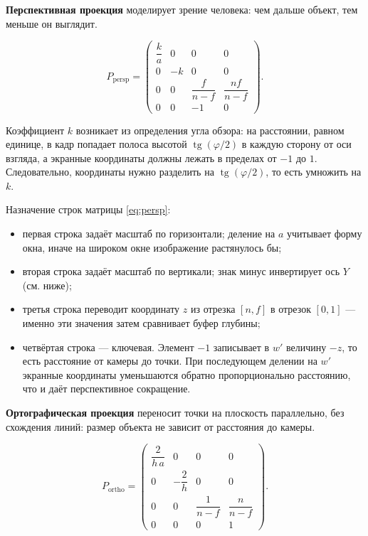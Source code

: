 \documentclass[14pt,a4paper]{extarticle}
\begin{document}
\textbf{Перспективная проекция} моделирует зрение человека: чем дальше объект,
тем меньше он выглядит.

\begin{equation}
	P_{\text{persp}} =
	\begin{pmatrix}
		\dfrac{k}{a} & 0 & 0 & 0 \\[8pt]
		0 & -k & 0 & 0 \\[8pt]
		0 & 0 & \dfrac{f}{n - f} & \dfrac{n f}{n - f} \\[8pt]
		0 & 0 & -1 & 0
	\end{pmatrix}.
	\label{eq:persp}
\end{equation}

Коэффициент $k$ возникает из определения угла обзора: на расстоянии, равном
единице, в кадр попадает полоса высотой $\operatorname{tg}(\varphi/2)$ в каждую
сторону от оси взгляда, а экранные координаты должны лежать в пределах от $-1$
до $1$. Следовательно, координаты нужно разделить на $\operatorname{tg}
(\varphi/2)$, то есть умножить на $k$.

Назначение строк матрицы \eqref{eq:persp}:

\begin{itemize}[leftmargin=*, nosep]
	\item первая строка задаёт масштаб по горизонтали; деление на $a$ учитывает
	форму окна, иначе на широком окне изображение растянулось бы;
	\item вторая строка задаёт масштаб по вертикали; знак минус инвертирует
	ось $Y$ (см. ниже);
	\item третья строка переводит координату $z$ из отрезка $[n, f]$ в отрезок
	$[0, 1]$ — именно эти значения затем сравнивает буфер глубины;
	\item четвёртая строка — ключевая. Элемент $-1$ записывает в $w'$ величину
	$-z$, то есть расстояние от камеры до точки. При последующем делении на
	$w'$ экранные координаты уменьшаются обратно пропорционально расстоянию,
	что и даёт перспективное сокращение.
\end{itemize}

\textbf{Ортографическая проекция} переносит точки на плоскость параллельно,
без схождения линий: размер объекта не зависит от расстояния до камеры.

\begin{equation}
	P_{\text{ortho}} =
	\begin{pmatrix}
		\dfrac{2}{h\,a} & 0 & 0 & 0 \\[8pt]
		0 & -\dfrac{2}{h} & 0 & 0 \\[8pt]
		0 & 0 & \dfrac{1}{n - f} & \dfrac{n}{n - f} \\[8pt]
		0 & 0 & 0 & 1
	\end{pmatrix}.
	\label{eq:ortho}
\end{equation}
\end{document}
